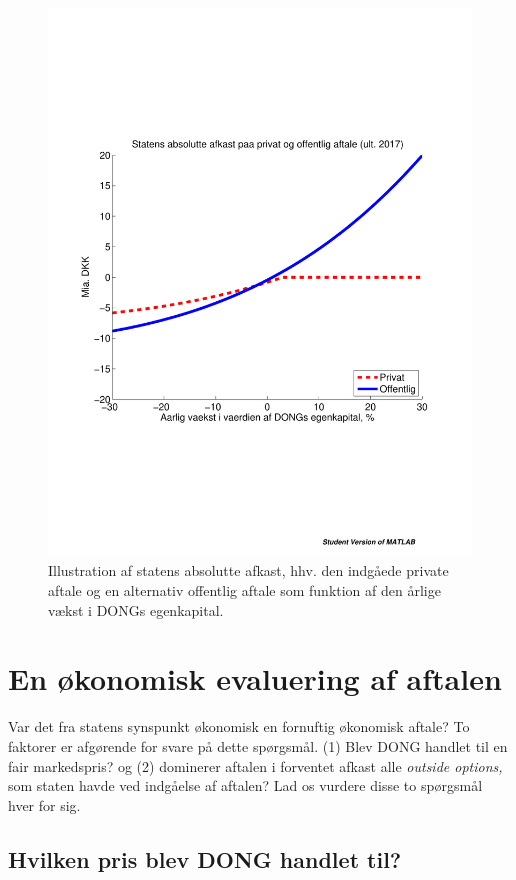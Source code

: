 \documentclass{article}
\begin{document}
\begin{figure}
\includegraphics[scale=0.8]{../matlab/figs/private_public_deal}
\caption{Illustration af statens absolutte afkast, hhv. den indg\aa{}ede private aftale og en alternativ offentlig aftale som funktion af den \aa{}rlige v\ae{}kst i DONGs egenkapital. }
\label{fig:privat_off}
\end{figure}


\section{En økonomisk evaluering af aftalen}

Var det fra statens synspunkt økonomisk en fornuftig økonomisk aftale? To faktorer er afgørende for svare på dette spørgsmål. (1) Blev DONG handlet til en fair markedspris? og (2) dominerer aftalen i forventet afkast  alle \emph{outside options,} som staten havde ved indgåelse af aftalen? Lad os vurdere disse to spørgsmål hver for sig.

\subsection{Hvilken pris blev DONG handlet til?}
\end{document}
